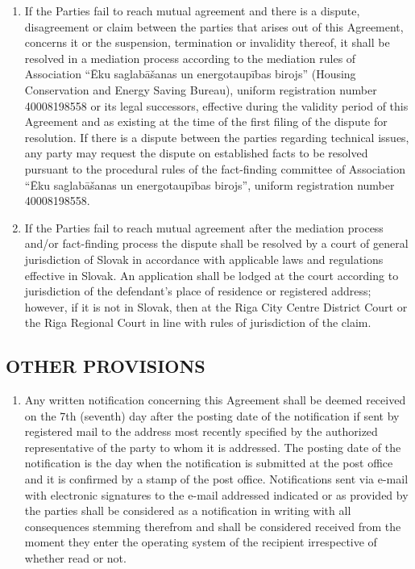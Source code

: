 \documentclass[a4paper]{article}
\begin{document}
\begin{multicols}{2}
\begin{enumerate}
  \item{If the Parties fail to reach mutual agreement and there is a
      dispute, disagreement or claim between the parties that arises
      out of this Agreement, concerns it or the suspension,
      termination or invalidity thereof, it shall be resolved in a
      mediation process according to the mediation rules of
      Association “Ēku saglabāšanas un energotaupības birojs” (Housing
      Conservation and Energy Saving Bureau), uniform registration
      number 40008198558 or its legal successors, effective during the
      validity period of this Agreement and as existing at the time of
      the first filing of the dispute for resolution. If there is a
      dispute between the parties regarding technical issues, any
      party may request the dispute on established facts to be
      resolved pursuant to the procedural rules of the fact{-}finding
      committee of Association “Ēku saglabāšanas un energotaupības
      birojs”, uniform registration number 40008198558.}

  \item{If the Parties fail to reach mutual agreement after the
      mediation process and/or fact{-}finding process the dispute
      shall be resolved by a court of general jurisdiction of Slovak
      in accordance with applicable laws and regulations effective in
      Slovak. An application shall be lodged at the court according to
      jurisdiction of the defendant’s place of residence or registered
      address; however, if it is not in Slovak, then at the Riga City
      Centre District Court or the Riga Regional Court in line with
      rules of jurisdiction of the claim.}
  \end{enumerate}

  \subsection{OTHER PROVISIONS}

  \begin{enumerate}
  \item{Any written notification concerning this Agreement shall be
      deemed received on the 7th (seventh) day after the posting date
      of the notification if sent by registered mail to the address
      most recently specified by the authorized representative of the
      party to whom it is addressed. The posting date of the
      notification is the day when the notification is submitted at
      the post office and it is confirmed by a stamp of the post
      office. Notifications sent via e{-}mail with electronic
      signatures to the e{-}mail addressed indicated or as provided by
      the parties shall be considered as a notification in writing
      with all consequences stemming therefrom and shall be considered
      received from the moment they enter the operating system of the
      recipient irrespective of whether read or not.}


\end{enumerate}
\end{multicols}
\end{document}
